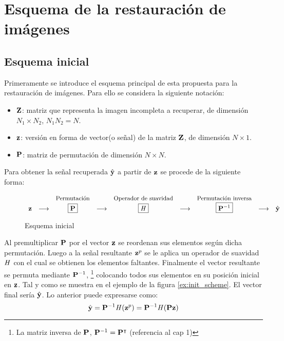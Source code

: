 \chapter{Esquema de la restauraci\'on de im\'agenes}\label{chapter:SCHEME}

\section{Esquema inicial}
Primeramente se introduce el esquema principal de esta propuesta para la restauraci\'on de im\'agenes. Para ello se considera la siguiente notaci\'on:
\begin{itemize}
	\item $\Z$: matriz que representa la imagen incompleta a recuperar, de dimensi\'on\\ $N_1 \times N_2$, $N_1N_2 = N$.
	\item $\z$: versión en forma de vector(o señal) de la matriz $\Z$, de dimensi\'on $N \times 1$.
	\item $\P$: matriz de permutaci\'on de dimensi\'on $N \times N$.
\end{itemize}
Para obtener la señal recuperada $\yhat$ a partir de $\z$ se procede de la siguiente forma:
\begin{figure}[H]
	\centering
	\begin{equation*}
		\begin{array}[t]{ccccccccc}
			& & \mbox{\small{Permutaci\'on}} & & \mbox{\small{Operador de suavidad}} & & \mbox{\small{Permutaci\'on inversa}} & &\\
			\z & \longrightarrow & \boxed{\P} & \longrightarrow & \boxed{\H} & \longrightarrow & \boxed{\P^{-1}} & \longrightarrow & \yhat \\
		\end{array}
	\end{equation*}
	\caption{Esquema inicial}
	\label{fig:init_scheme}
\end{figure}

Al premultiplicar $\P$ por el vector $\z$ se reordenan sus elementos seg\'un dicha permutaci\'on. Luego a la señal resultante $\z^p$ se le aplica un operador de suavidad $\H$ con el cual se obtienen los elementos faltantes. Finalmente el vector resultante se permuta mediante $\P^{-1}$, \footnote{La matriz inversa de $\P$, $\P^{-1} = \P^\intercal$ (referencia al cap 1)} colocando todos sus elementos en su posici\'on inicial en $\z$. Tal y como se muestra en el ejemplo de la figura \ref{ex:init_scheme}. El vector final ser\'ia $\yhat$. Lo anterior puede expresarse como:
\begin{equation}
	\yhat = \P^{-1}\H(\z^p) = \P^{-1}\H(\P\z)
	\label{eq:init_yhat}
\end{equation}

